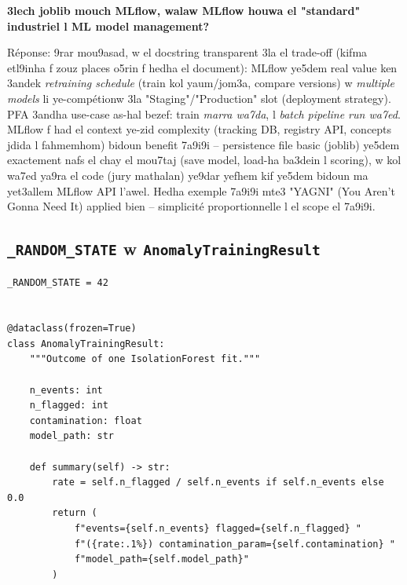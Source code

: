 \documentclass[11pt,a4paper]{report}
\DeclareRobustCommand{\code}[1]{\texttt{#1}}
\begin{document}
\begin{soual}
\textbf{3lech joblib mouch MLflow, walaw MLflow houwa el "standard"
industriel l ML model management?}

Réponse: 9rar mou9asad, w el docstring transparent 3la el trade-off
(kifma etl9inha f zouz places o5rin f hedha el document): MLflow ye5dem
real value ken 3andek \emph{retraining schedule} (train kol yaum/jom3a,
compare versions) w \emph{multiple models} li ye-compétionw 3la "Staging"/"Production"
slot (deployment strategy). PFA 3andha use-case as-hal bezef: train
\emph{marra wa7da}, l \emph{batch pipeline run wa7ed}. MLflow f had el
context ye-zid complexity (tracking DB, registry API, concepts jdida
l fahmemhom) bidoun benefit 7a9i9i -- persistence file basic (joblib)
ye5dem exactement nafs el chay el mou7taj (save model, load-ha ba3dein
l scoring), w kol wa7ed ya9ra el code (jury mathalan) ye9dar yefhem
kif ye5dem bidoun ma yet3allem MLflow API l'awel. Hedha exemple 7a9i9i mte3
"YAGNI" (You Aren't Gonna Need It) applied bien -- simplicité proportionnelle
l el scope el 7a9i9i.
\end{soual}

\subsection{\code{\_RANDOM\_STATE} w \code{AnomalyTrainingResult}}

\begin{lstlisting}[style=pystyle]
_RANDOM_STATE = 42


@dataclass(frozen=True)
class AnomalyTrainingResult:
    """Outcome of one IsolationForest fit."""

    n_events: int
    n_flagged: int
    contamination: float
    model_path: str

    def summary(self) -> str:
        rate = self.n_flagged / self.n_events if self.n_events else 0.0
        return (
            f"events={self.n_events} flagged={self.n_flagged} "
            f"({rate:.1%}) contamination_param={self.contamination} "
            f"model_path={self.model_path}"
        )
\end{lstlisting}
\end{document}

